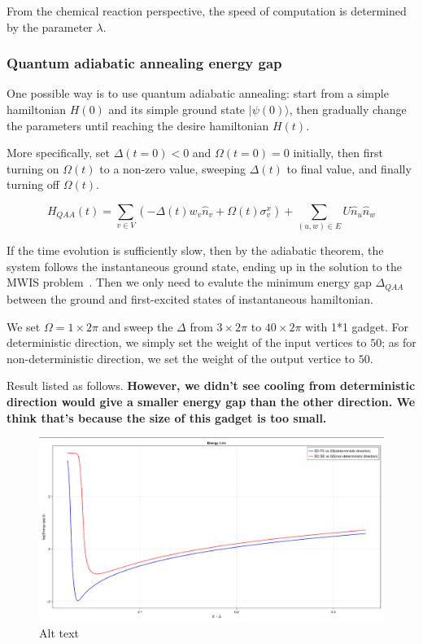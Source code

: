 \documentclass[twocolumn,superscriptaddress,english,showpacs,longbibliography]{revtex4-2}
\begin{document}
From the chemical reaction perspective, the speed of computation is
determined by the parameter $\lambda$.

\subsubsection{Quantum adiabatic annealing energy gap}\label{quantum-adiabatic-annealing-energy-gap}

One possible way is to use quantum adiabatic annealing: start from a
simple hamiltonian $H(0)$ and its simple ground state
$|\psi(0)\rangle$, then gradually change the parameters until reaching
the desire hamiltonian $H(t)$.

More specifically, set $\Delta(t=0) <0$ and $\Omega(t=0) =0$
initially, then first turning on $\Omega(t)$ to a non-zero value,
sweeping $\Delta(t)$ to final value, and finally turning off
$\Omega(t)$.

\begin{equation}
H_{QAA}(t) = \sum_{v\in V} (-\Delta(t)w_v \hat n_v + \Omega(t)\sigma_{v}^x) + \sum_{(u,w) \in E} U\hat n_u \hat n_w
\end{equation}

If the time evolution is sufficiently slow, then by the adiabatic
theorem, the system follows the instantaneous ground state, ending up in
the solution to the MWIS problem~\cite{Pichler2018}.
Then we only need to evalute
the minimum energy gap $\Delta_{QAA}$ between the ground and
first-excited states of instantaneous hamiltonian.

We set $\Omega = 1 \times 2\pi$ and sweep the $\Delta$ from $3
\times 2\pi$ to $40 \times 2\pi$ with 1*1 gadget. For deterministic
direction, we simply set the weight of the input vertices to $50$; as
for non-deterministic direction, we set the weight of the output vertice
to $50$.

Result listed as follows. \textbf{However, we didn't see cooling from
deterministic direction would give a smaller energy gap than the other
direction. We think that's because the size of this gadget is too
small.}

\begin{figure}
\centering
\includegraphics[width=\columnwidth]{../notes/images/energy_gap_1_gadget.png}
\caption{Alt text}
\end{figure}
\end{document}
